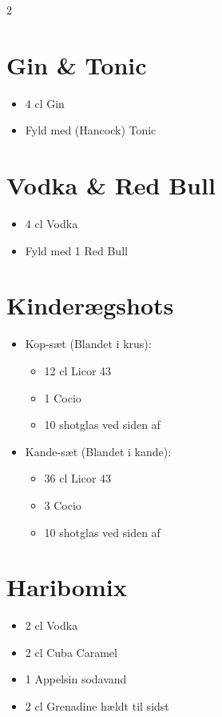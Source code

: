 \documentclass[a4paper,12pt]{article}
\begin{document}
\begin{multicols}{2}
\section*{Gin \& Tonic}
\begin{itemize}
    \item 4 cl Gin
    \item Fyld med (Hancock) Tonic
\end{itemize}


\section*{Vodka \& Red Bull}
\begin{itemize}
    \item 4 cl Vodka
    \item Fyld med 1 Red Bull
\end{itemize}


\section*{Kinderægshots}
\begin{itemize}
    \item Kop-sæt (Blandet i krus):
    \begin{itemize}
        \item 12 cl Licor 43
        \item 1 Cocio
        \item 10 shotglas ved siden af
    \end{itemize}
    \item Kande-sæt (Blandet i kande):
    \begin{itemize}
        \item 36 cl Licor 43
        \item 3 Cocio
        \item 10 shotglas ved siden af
    \end{itemize}
\end{itemize}

\columnbreak

\section*{Haribomix}
\begin{itemize}
    \item 2 cl Vodka
    \item 2 cl Cuba Caramel
    \item 1 Appelsin sodavand
    \item 2 cl Grenadine hældt til sidst
\end{itemize}


\end{multicols}
\end{document}
